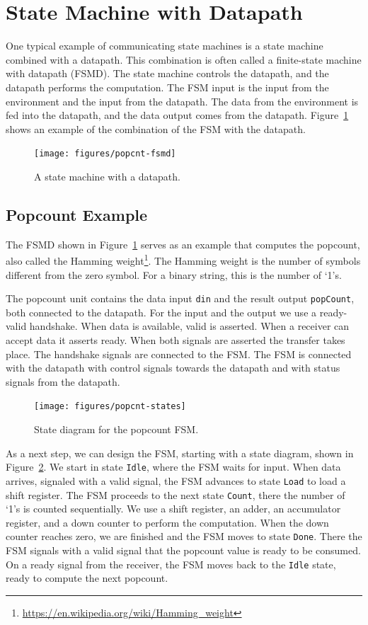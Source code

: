 \documentclass[%
    10pt,
    headinclude, footexclude,
    openright, %
    notitlepage,
    cleardoubleempty,
    headsepline,
    pointlessnumbers,
    bibtotoc, idxtotoc,
    ]{scrbook}
\newcommand{\code}[1]{{\small{\texttt{#1}}}}
\newcommand{\myref}[2]{\href{#1}{#2}}
\renewcommand{\myref}[2]{{#2}{\footnote{\url{#1}}}}
\begin{document}
\section{State Machine with Datapath}

One typical example of communicating state machines is a state machine
combined with a datapath. This combination is often called a finite-state machine
with datapath (FSMD). The state machine controls the datapath, and the datapath
performs the computation. The FSM input is the input from the environment and the input
from the datapath. The data from the environment is fed into the datapath, and the
data output comes from the datapath. Figure~\ref{fig:popcnt-fsmd} shows an example
of the combination of the FSM with the datapath.

\begin{figure}
  \centering
  \texttt{[image: figures/popcnt-fsmd]}
  \caption{A state machine with a datapath.}
  \label{fig:popcnt-fsmd}
\end{figure}

\subsection{Popcount Example}

The FSMD shown in Figure~\ref{fig:popcnt-fsmd} serves as an example that computes the
popcount, also called the \myref{https://en.wikipedia.org/wiki/Hamming_weight}{Hamming weight}.
The Hamming weight is the number of symbols different from the zero symbol.
For a binary string, this is the number of `1's.

The popcount unit contains the data input \code{din} and the result output \code{popCount},
both connected to the datapath. For the input and the output we use a ready-valid handshake.
When data is available, valid is asserted. When a receiver can accept data it asserts ready.
When both signals are asserted the transfer takes place. The handshake signals are connected
to the FSM. The FSM is connected with the datapath with control signals towards the datapath
and with status signals from the datapath.

\begin{figure}
  \centering
  \texttt{[image: figures/popcnt-states]}
  \caption{State diagram for the popcount FSM.}
  \label{fig:popcnt-states}
\end{figure}

As a next step, we can design the FSM, starting with a state diagram, shown in
Figure~\ref{fig:popcnt-states}. We start in state \code{Idle}, where the FSM waits
for input. When data arrives, signaled with a valid signal, the FSM advances to state \code{Load}
to load a shift register. The FSM proceeds to the next state \code{Count}, there the number
of `1's is counted sequentially. We use a shift register, an adder, an accumulator
register, and a down counter to perform the computation. When the down counter reaches
zero, we are finished and the FSM moves to state \code{Done}. There the FSM signals with a valid
signal that the popcount value is ready to be consumed. On a ready signal from the
receiver, the FSM moves back to the \code{Idle} state, ready to compute the next popcount.
\end{document}
